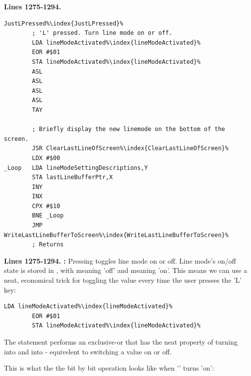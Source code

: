 \clearpage
\textbf{Lines 1275-1294. } 
\begin{lstlisting}[caption=From \icode{CheckKeyboardInput\index{CheckKeyboardInput}}.,escapechar=\%]
JustLPressed%\index{JustLPressed}%   
        ; 'L' pressed. Turn line mode on or off.
        LDA lineModeActivated%\index{lineModeActivated}%
        EOR #$01
        STA lineModeActivated%\index{lineModeActivated}%
        ASL 
        ASL 
        ASL 
        ASL 
        TAY 

        ; Briefly display the new linemode on the bottom of the screen.
        JSR ClearLastLineOfScreen%\index{ClearLastLineOfScreen}%
        LDX #$00
_Loop   LDA lineModeSettingDescriptions,Y
        STA lastLineBufferPtr,X
        INY 
        INX 
        CPX #$10
        BNE _Loop
        JMP WriteLastLineBufferToScreen%\index{WriteLastLineBufferToScreen}%
        ; Returns
\end{lstlisting}

\clearpage

\textbf{Lines 1275-1294. :} 
Pressing  toggles line mode on or off. Line mode's on/off state is 
stored in , with  meaning 'off' and
 meaning 'on'. This means we can use a neat, economical trick
for toggling the value every time the user presses the 'L' key:

\begin{lstlisting}[escapechar=\%]
        LDA lineModeActivated%\index{lineModeActivated}%
        EOR #$01
        STA lineModeActivated%\index{lineModeActivated}%
\end{lstlisting}

The  statement performs an exclusive-or that has the neat property of
turning  into  and  into  - equivelent
to switching a value on or off.

This is what the the bit by bit operation looks like when '' turns
 'on':

